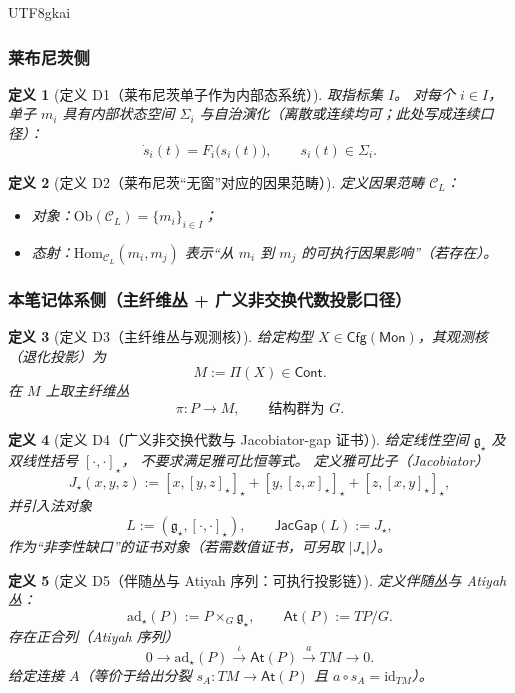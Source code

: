\documentclass[12pt]{article}
\newtheorem{definition}{定义}[section]
\begin{document}
\begin{CJK*}{UTF8}{gkai}
\subsubsection{莱布尼茨侧}

\begin{definition}[定义 D1（莱布尼茨单子作为内部态系统）]
\label{def:tex29-leibniz-internal-dynamics}
取指标集 $I$。
对每个 $i\in I$，单子 $m_i$ 具有内部状态空间 $\Sigma_i$ 与自治演化（离散或连续均可；此处写成连续口径）：
\[
  \dot{s}_i(t)=F_i\bigl(s_i(t)\bigr),
  \qquad
  s_i(t)\in \Sigma_i.
\]
\end{definition}

\begin{definition}[定义 D2（莱布尼茨“无窗”对应的因果范畴）]
\label{def:tex29-category-cl}
定义因果范畴 $\mathcal{C}_L$：
\begin{itemize}
  \item 对象：$\mathrm{Ob}(\mathcal{C}_L)=\{m_i\}_{i\in I}$；
  \item 态射：$\mathrm{Hom}_{\mathcal{C}_L}(m_i,m_j)$ 表示“从 $m_i$ 到 $m_j$ 的可执行因果影响”（若存在）。
\end{itemize}
\end{definition}

\subsubsection{本笔记体系侧（主纤维丛 + 广义非交换代数投影口径）}

\begin{definition}[定义 D3（主纤维丛与观测核）]
\label{def:tex29-category-cg-bundle}
给定构型 $X\in\mathsf{Cfg}(\mathsf{Mon})$，其观测核（退化投影）为
\[
  M:=\Pi(X)\in\mathsf{Cont}.
\]
在 $M$ 上取主纤维丛
\[
  \pi:P\to M,
  \qquad
  \text{结构群为 }G.
\]
\end{definition}

\begin{definition}[定义 D4（广义非交换代数与 Jacobiator-gap 证书）]
\label{def:tex29-category-cg-jacgap}
给定线性空间 $\mathfrak{g}_{\star}$ 及双线性括号 $[\cdot,\cdot]_{\star}$，
不要求满足雅可比恒等式。
定义雅可比子（Jacobiator）
\[
  J_{\star}(x,y,z):=[x,[y,z]_{\star}]_{\star}+[y,[z,x]_{\star}]_{\star}+[z,[x,y]_{\star}]_{\star},
\]
并引入法对象
\[
  L:=(\mathfrak{g}_{\star},[\cdot,\cdot]_{\star}),
  \qquad
  \mathsf{JacGap}(L):=J_{\star},
\]
作为“非李性缺口”的证书对象（若需数值证书，可另取 $|J_{\star}|$）。
\end{definition}

\begin{definition}[定义 D5（伴随丛与 Atiyah 序列：可执行投影链）]
\label{def:tex29-category-cg-atiyah}
定义伴随丛与 Atiyah 丛：
\[
  \mathrm{ad}_{\star}(P):=P\times_G \mathfrak{g}_{\star},
  \qquad
  \mathsf{At}(P):=TP/G.
\]
存在正合列（Atiyah 序列）
\[
  0\longrightarrow \mathrm{ad}_{\star}(P)\xrightarrow{\ \iota\ }\mathsf{At}(P)\xrightarrow{\ a\ }TM\longrightarrow 0.
\]
给定连接 $A$（等价于给出分裂 $s_A:TM\to\mathsf{At}(P)$ 且 $a\circ s_A=\mathrm{id}_{TM}$）。


\end{definition}
\end{CJK*}
\end{document}
